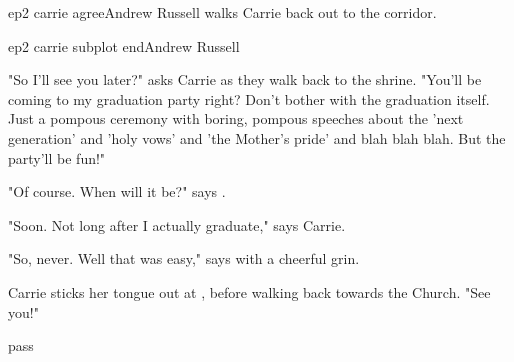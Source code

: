 \documentclass{book}
\begin{document}
\begin{childnode}{ep2 carrie agree}{Andrew Russell}
     \name{} walks Carrie back out to the corridor.






\end{childnode}

\begin{childnode}{ep2 carrie subplot end}{Andrew Russell}


    "So I'll see you later?" asks Carrie as they walk back to the shrine. "You'll be coming to my graduation party right? Don't bother with the graduation itself. Just a pompous ceremony with 
    boring, pompous speeches about the
    'next generation' and 'holy vows' and 'the Mother's pride' and blah blah blah. But the party'll be fun!"

    "Of course. When will it be?" says \name{}.

    "Soon. Not long after I actually graduate," says Carrie.

    "So, never. Well that was easy," says \name{} with a cheerful grin.

    Carrie sticks her tongue out at \name{}, before walking back towards the Church. "See you!"


\end{childnode}

\begin{closeScene}
        pass
\end{closeScene}
\end{document}
